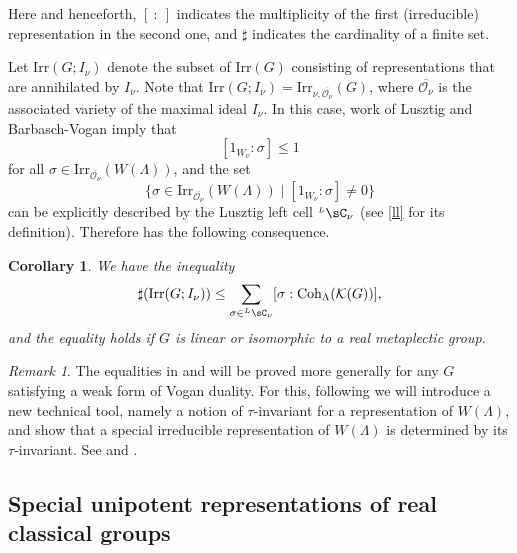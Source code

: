 \documentclass[12pt]{amsart}
\newcommand{\CK}{{\mathcal {K}}}
\newcommand{\CO}{{\mathcal {O}}}
\numberwithin{equation}{section}
\newtheorem{cor}[thm]{Corollary}
\theoremstyle{remark}
\newtheorem{remark}[thm]{Remark}
\def\Irr{\mathrm{Irr}}
\def\LC{{}^{\scriptscriptstyle L}\sC}
\def\Coh{\mathrm{Coh}}
\begin{document}
Here and henceforth, $[\ : \ ]$ indicates the multiplicity of the first
(irreducible) representation in the second one, and $\sharp$ indicates the cardinality of a finite set.

Let $\Irr(G;I_\nu)$ denote the subset of $\Irr(G)$ consisting of  representations that are annihilated by $I_\nu$. Note that $\Irr(G;I_\nu)=
\Irr_{\nu,\overline{\CO_\nu}}(G)$, where $\overline{\CO_\nu}$ is the associated variety of the maximal ideal $I_\nu$. In this case, work of Lusztig \cite{Lu}
and Barbasch-Vogan \cite{BVUni} imply that \[ [1_{W_{\nu}}: \sigma]\leq 1\]
for all $\sigma \in \Irr_{\overline{\CO_\nu}}(W(\Lambda))$, and
the set
\[
\{\sigma\in
\Irr_{\overline{\CO_\nu}}(W(\Lambda))\mid [1_{W_{\nu}}: \sigma]\neq 0\}
\]
can be explicitly described by the Lusztig left cell $\LC_{\nu}$ (see \eqref{ll} for its definition).  Therefore  has the following consequence.


 \begin{cor}\label{Mcountleq}
We have the inequality
  \begin{equation*}%
    \sharp(\Irr(G;I_\nu)) \leq \sum_{\sigma \in \LC_{\nu}}   [\sigma:\Coh_{\Lambda}(\CK(G))],
  \end{equation*}
     and the equality holds if $G$ is linear or isomorphic to a real metaplectic group.
\end{cor}

\begin{remark} The equalities in  and  will be proved more generally for any $G$ satisfying a weak form of Vogan duality. For this,  following \cite{FJMN} we will introduce a new technical tool, namely a notion of $\tau$-invariant for a representation of $W(\Lambda)$, and show that a special irreducible representation of $W(\Lambda)$ is determined by its $\tau$-invariant. See  and .
\end{remark}

 \subsection{Special unipotent representations of real classical groups}
 \label{sec:defunip}

\end{document}
